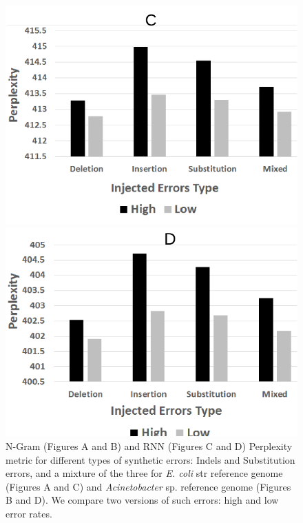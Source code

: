 \begin{figure}[t]
\begin{minipage}[t]{1.0\textwidth}
\begin{minipage}[t]{.24\textwidth}
  \includegraphics[width=\linewidth]{figs/Synth_RNN_12.pdf}
\end{minipage}
\begin{minipage}[t]{.24\textwidth}
\centering
  \includegraphics[width=\linewidth]{figs/Synth_RNN_3.pdf}
\end{minipage}
\end{minipage}
  \caption{N-Gram (Figures A and B) and RNN (Figures C and D)  Perplexity metric for different types of synthetic errors: Indels and Substitution errors, and a mixture of the three for \textit{E. coli} str reference genome (Figures A and C) and \textit{Acinetobacter} sp. reference genome (Figures B and D). We compare two versions of such errors: high and low error rates.}
\label{figure:Synthetic_Errors_Detection}
\end{figure}


  
